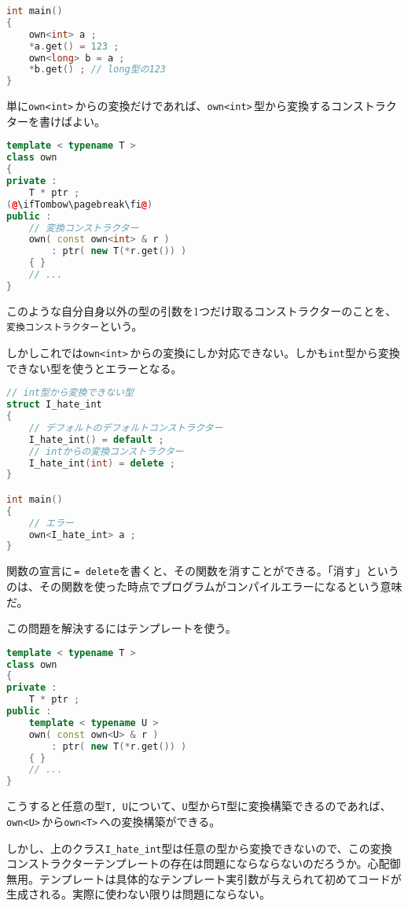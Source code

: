 \begin{lstlisting}[language={C++}]
int main()
{
    own<int> a ;
    *a.get() = 123 ;
    own<long> b = a ;
    *b.get() ; // long型の123
}
\end{lstlisting}

単に\texttt{own<int>}\,からの変換だけであれば、\texttt{own<int>}\,型から変換するコンストラクターを書けばよい。

\begin{lstlisting}[language={C++}]
template < typename T >
class own
{
private :
    T * ptr ;
(@\ifTombow\pagebreak\fi@)
public :
    // 変換コンストラクター
    own( const own<int> & r )
        : ptr( new T(*r.get()) )
    { }
    // ...
}
\end{lstlisting}

このような自分自身以外の型の引数を1つだけ取るコンストラクターのことを、\texttt{変換コンストラクター}という。

しかしこれでは\texttt{own<int>}\,からの変換にしか対応できない。しかも\texttt{int}型から変換できない型を使うとエラーとなる。

\begin{lstlisting}[language={C++}]
// int型から変換できない型
struct I_hate_int
{
    // デフォルトのデフォルトコンストラクター
    I_hate_int() = default ;
    // intからの変換コンストラクター
    I_hate_int(int) = delete ;
}

int main()
{
    // エラー
    own<I_hate_int> a ;
}
\end{lstlisting}

関数の宣言に\,\texttt{= delete}を書くと、その関数を消すことができる。「消す」というのは、その関数を使った時点でプログラムがコンパイルエラーになるという意味だ。

この問題を解決するにはテンプレートを使う。

\begin{lstlisting}[language={C++}]
template < typename T >
class own
{
private :
    T * ptr ;
public :
    template < typename U >
    own( const own<U> & r )
        : ptr( new T(*r.get()) )
    { }
    // ...
}
\end{lstlisting}

こうすると任意の型\texttt{T, U}について、\texttt{U}型から\texttt{T}型に変換構築できるのであれば、\texttt{own<U>}\,から\texttt{own<T>}\,への変換構築ができる。

しかし、上のクラス\texttt{I\_hate\_int}型は任意の型から変換できないので、この変換コンストラクターテンプレートの存在は問題にならならないのだろうか。心配御無用。テンプレートは具体的なテンプレート実引数が与えられて初めてコードが生成される。実際に使わない限りは問題にならない。

